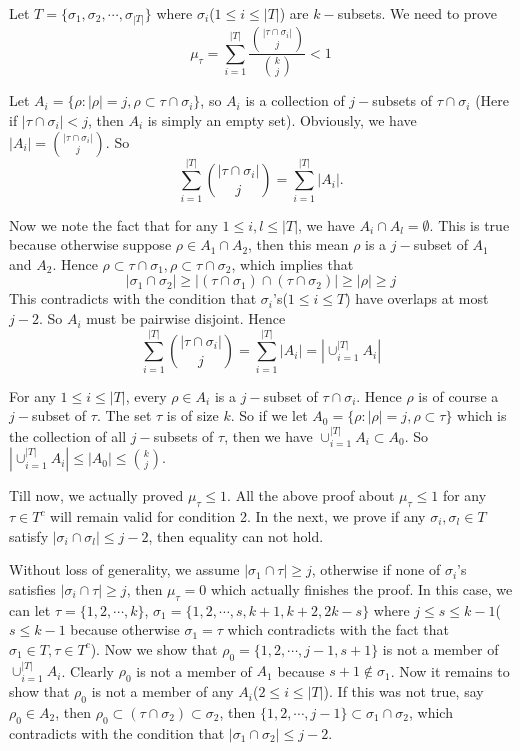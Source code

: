 \documentclass{article}
\begin{document}
Let $T=\{\sigma_1, \sigma_2, \cdots, \sigma_{|T|}\}$ 
where $\sigma_i$($1\le i\le |T|$) are $k-$subsets. 
We need to prove $$\mu_\tau=\sum_{i=1}^{|T|}\frac{{|\tau\cap \sigma_i|\choose j}}{{k\choose j}}<1$$

Let $A_i=\{\rho: |\rho|=j, \rho\subset \tau\cap\sigma_i \}$, so $A_i$ is a collection of $j-$subsets
of $\tau\cap \sigma_i$ (Here if $|\tau\cap\sigma_i|<j$, then $A_i$ is simply an empty set).
Obviously, we have $|A_i|={|\tau\cap \sigma_i|\choose j}$. 
So $$\sum_{i=1}^{|T|} {|\tau\cap\sigma_i|\choose j}=\sum_{i=1}^{|T|} |A_i|.$$

Now we note the fact that for any 
$1\le i, l\le |T|$, we have $A_i\cap A_l=\emptyset$. This is true because otherwise
suppose $\rho\in A_1\cap A_2$, then this mean $\rho$ is a $j-$subset of $A_1$ and $A_2$. Hence
$\rho\subset \tau\cap\sigma_1, \rho\subset \tau\cap\sigma_2$, which implies that 
$$|\sigma_1\cap\sigma_2|\ge |(\tau\cap\sigma_1)\cap (\tau\cap\sigma_2)|\ge |\rho|\ge j$$
This contradicts with the condition that $\sigma_i$'s($1\le i\le T$) have overlaps at most $j-2$. 
So $A_i$ must be pairwise disjoint. Hence
$$\sum_{i=1}^{|T|} {|\tau\cap\sigma_i|\choose j}=\sum_{i=1}^{|T|} |A_i|=|\cup_{i=1}^{|T|} A_i|$$

For any $1\le i\le |T|$, every $\rho\in A_i$ is a $j-$subset of $\tau\cap\sigma_i$. Hence
$\rho$ is of course a $j-$subset of $\tau$. The set $\tau $ is of size $k$. So if we let 
$A_0=\{\rho: |\rho|=j, \rho\subset \tau\}$ which is the collection of all $j-$subsets of $\tau$, 
then we have $\cup_{i=1}^{|T|} A_i\subset A_0$. So 
$|\cup_{i=1}^{|T|} A_i|\le  |A_0|\le {k\choose j}$. 

Till now, we actually proved $\mu_\tau\le 1$. All the above proof about $\mu_\tau\le 1$ for any 
$\tau\in T^c$ will remain valid 
for condition 2. In the next, 
we prove if any $\sigma_i, \sigma_l\in T$ satisfy $|\sigma_i\cap\sigma_l|\le j-2$, 
then equality can not hold. 

Without loss of generality, we assume $|\sigma_1\cap\tau|\ge j$, otherwise if none of $\sigma_i$'s 
satisfies $|\sigma_i\cap\tau|\ge j$, then $\mu_\tau=0$ which actually finishes the proof.
In this case, we can let $\tau=\{1,2,\cdots,k\}$, $\sigma_1=\{1,2,\cdots,s, k+1, k+2, 2k-s\}$ 
where $j\le s\le k-1$($s\le k-1$ because otherwise $\sigma_1=\tau$ which contradicts with the fact
that $\sigma_1\in T, \tau\in T^c$). 
Now we show that $\rho_0=\{1,2, \cdots, j-1, s+1\}$ is not a member of $\cup_{i=1}
^{|T|} A_i$. 
Clearly $\rho_0$ is not a member of $A_1$ because $s+1\not\in \sigma_1$. 
Now it remains to show that $\rho_0$ is not
a member of any $A_i$($2\le i\le |T|$). If this was not true, say $\rho_0\in A_2$, then 
$\rho_0\subset (\tau\cap\sigma_2)\subset \sigma_2$, then $\{1, 2, \cdots, j-1\}\subset \sigma_1\cap
\sigma_2$, which contradicts with the condition that $|\sigma_1\cap\sigma_2|\le j-2$. 
\end{document}
